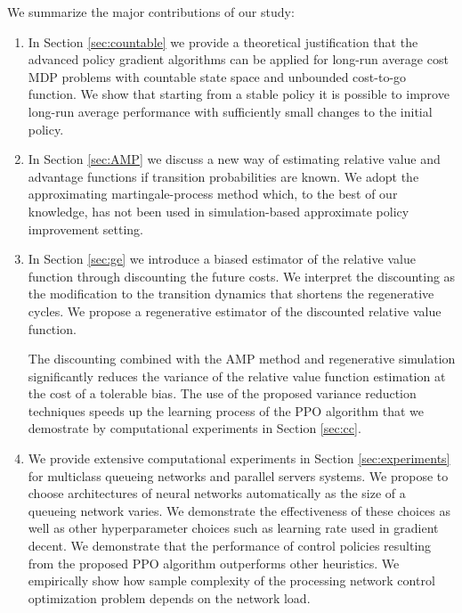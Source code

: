 \documentclass[11pt]{article}
\theoremstyle{definition}
\numberwithin{equation}{section}
\begin{document}
We summarize the major contributions of our study:
\begin{enumerate}
\item In Section \ref{sec:countable} we provide a theoretical
  justification that the advanced policy gradient algorithms can
  be applied for long-run average cost MDP problems with countable state space and unbounded
  cost-to-go function. We show that starting from a stable policy it
  is possible to improve long-run average performance with
  sufficiently small changes to the initial policy.

\item In Section \ref{sec:AMP} we discuss a new way of estimating relative value
  and advantage functions if transition probabilities are known. We
  adopt the approximating martingale-process method
  \cite{Henderson2002} which, to the best of our knowledge, has not
  been used in simulation-based approximate
    policy improvement setting.
  \item  In Section \ref{sec:ge} we introduce a biased estimator
      of the relative value function through discounting the future
      costs. We interpret the discounting as the modification to the
      transition dynamics that shortens the regenerative cycles.
      We propose a regenerative estimator of the   discounted relative value function.

 The discounting  combined with the AMP method and regenerative simulation significantly reduces the variance of the relative value function estimation at the cost of a tolerable bias. The use of the proposed variance reduction techniques  speeds up the learning process of the PPO algorithm that we demostrate by  computational experiments in Section
  \ref{sec:cc}.


\item We provide extensive computational experiments in Section
  \ref{sec:experiments} for multiclass queueing networks and parallel
  servers systems.  We propose to choose architectures of neural
  networks automatically as the size of a queueing network varies. We
  demonstrate the effectiveness of these choices as well as other
  hyperparameter choices such as learning rate used in gradient
  decent.  We demonstrate that the performance of control policies resulting
  from the proposed PPO algorithm outperforms other heuristics. We
  empirically show how sample complexity of the processing network
  control optimization problem depends on the network load.

   \end{enumerate}
\end{document}
